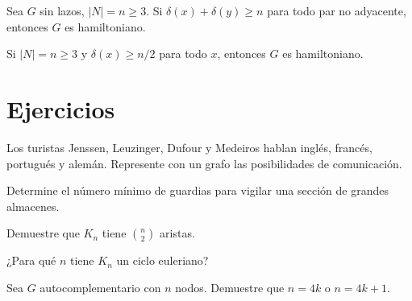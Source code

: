 \begin{teorema}[Ore]
Sea $G$ sin lazos, $|N| = n \geq 3$. Si $\delta(x) + \delta(y) \geq n$ para todo par no adyacente, entonces $G$ es hamiltoniano.
\end{teorema}

\begin{corolario}[Dirac]
Si $|N| = n \geq 3$ y $\delta(x) \geq n/2$ para todo $x$, entonces $G$ es hamiltoniano.
\end{corolario}

\section{Ejercicios}

\begin{ejercicio}
Los turistas Jenssen, Leuzinger, Dufour y Medeiros hablan inglés, francés, portugués y alemán. Represente con un grafo las posibilidades de comunicación.
\end{ejercicio}

\begin{ejercicio}
Determine el número mínimo de guardias para vigilar una sección de grandes almacenes.
\end{ejercicio}

\begin{ejercicio}
Demuestre que $K_n$ tiene $\binom{n}{2}$ aristas.
\end{ejercicio}

\begin{ejercicio}
¿Para qué $n$ tiene $K_n$ un ciclo euleriano?
\end{ejercicio}

\begin{ejercicio}
Sea $G$ autocomplementario con $n$ nodos. Demuestre que $n = 4k$ o $n = 4k+1$.
\end{ejercicio}